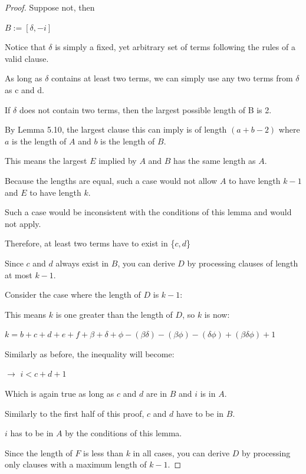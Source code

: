\documentclass[manuscript]{acmart}
\begin{document}
\begin{proof}
        Suppose not, then 

        $B := [\delta, -i]$

        Notice that $\delta$ is simply a fixed, yet arbitrary set of terms
        following the rules of a valid clause.

        As long as $\delta$ contains at least two terms, we can simply use 
        any two terms from $\delta$ as c and d.

        If $\delta$ does not contain two terms, then the largest possible
        length of B is 2.
        
        By Lemma 5.10, the largest clause this can imply is of length 
        $(a + b - 2)$ where $a$ is the length of $A$ and $b$ is the length 
        of $B$.

        This means the largest $E$ implied by $A$ and $B$ has the same 
        length as $A$.

        Because the lengths are equal, such a case would not allow $A$ to 
        have length $k - 1$ and $E$ to have length $k$.

        Such a case would be inconsistent with the conditions of this 
        lemma and would not apply.
        
        Therefore, at least two terms have to exist in \{$c, d$\}

        Since $c$ and $d$ always exist in $B$, you can derive $D$ by processing
        clauses of length at most $k-1$.
    
        Consider the case where the length of $D$ is $k - 1$:

        This means $k$ is one greater than the length of $D$, so $k$ is now:

        $k = b + c + d + e + f + \beta + \delta + \phi - (\beta \delta) - 
        (\beta \phi) - (\delta \phi) + (\beta \delta \phi) + 1$

        Similarly as before, the inequality will become:

        $\rightarrow$ $i < c + d + 1$

        Which is again true as long as $c$ and $d$ are in $B$ and $i$ is in $A$.

        Similarly to the first half of this proof, $c$ and $d$ have to be in
        $B$.

        $i$ has to be in $A$ by the conditions of this lemma.

        Since the length of $F$ is less than $k$ in all cases, you can derive
        $D$ by processing only clauses with a maximum length of $k-1$.
    \end{proof}
\end{document}

